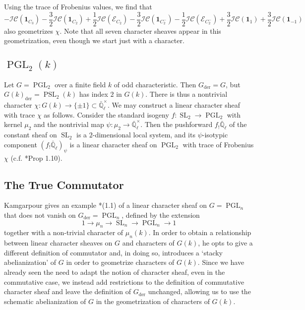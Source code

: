 \documentclass[10pt]{amsart}
\theoremstyle{plain}
\theoremstyle{definition}
\newcommand{\EE}{\mathbb{\bar Q}_\ell}
\newcommand{\Fq}{k}
\newcommand{\EEx}{\EE^\times}
\DeclareMathOperator{\SL}{SL}
\DeclareMathOperator{\PGL}{PGL}
\DeclareMathOperator{\PSL}{PSL}
\newcommand{\der}{_{\operatorname{der}}}
\newcommand{\cs}[1]{{\mathcal{#1}}}
\newcommand{\IC}{\mathcal{IC}}
\begin{document}
\vspace{0.1in}

\noindent 
Using the trace of Frobenius values, we find that 
\[
- \IC(\mathbf{1}_{C_3}) - \frac32 \IC(\mathbf{1}_{C_2}) + \frac12 \IC(\cs{E}_{C_2}) - \frac32 \IC(\mathbf{1}_{C_2^-}) - \frac12 \IC(\cs{E}_{C_2^-}) + \frac32 \IC(\mathbf{1}_1) + \frac32 \IC(\mathbf{1}_{-1})
\]
also geometrizes $\chi$.  Note that all seven character sheaves appear in this geometrization, even though we start just with a character.

\subsection{\texorpdfstring{$\PGL_2(k)$}{PGL(2, k)}}

Let $G = \PGL_2$ over a finite field $k$ of odd characteristic.  Then $G\der = G$, but $G(k)\der = \PSL_2(k)$ has index $2$ in $G(k)$.  There is thus a nontrivial character $\chi : G(k) \to \{\pm 1\} \subset \EEx$.  We may construct a linear character sheaf with trace $\chi$ as follows.  Consider the standard isogeny $f : \SL_2 \to \PGL_2$ with kernel $\mu_2$ and the nontrivial map $\psi : \mu_2 \to \EEx$.  Then the pushforward $f_! \EE$ of the constant sheaf on $\SL_2$ is a $2$-dimensional local system, and its $\psi$-isotypic component $(f_! \EE)_\psi$ is a linear character sheaf on $\PGL_2$ with trace of Frobenius $\chi$ (c.f. \cite{cunningham-roe:13a}*{Prop 1.10}).

\subsection{The True Commutator}


Kamgarpour gives an example \cite{kamgarpour:09a}*{(1.1)} of a linear character sheaf
on $G = \PGL_n$ that does not vanish on $G\der = \PGL_n$, defined by the extension
\[
1 \to \mu_n \to \SL_n \to \PGL_n \to 1
\]
together with a non-trivial character of $\mu_n(k)$. 
In order to obtain a relationship between linear character sheaves on $G$ and characters of $G(k)$,
he opts to give a different definition of commutator and, in doing so, introduces a `stacky abelianization' of $G$ in order to geometrize characters of $G(\Fq)$.
 Since we have already seen the need to adapt the
notion of character sheaf, even in the commutative case, we instead add restrictions
to the definition of commutative character sheaf and leave the definition of $G\der$ unchanged, allowing us to use the schematic abelianization of $G$ in the geometrization of characters of $G(\Fq)$.
\end{document}
